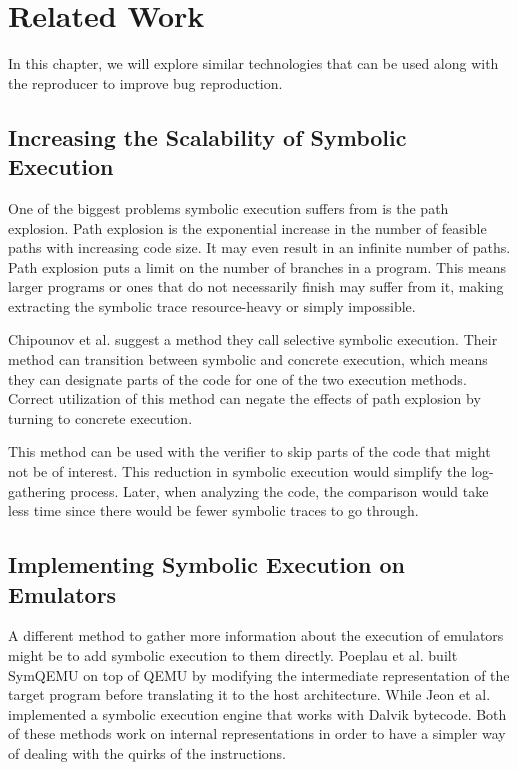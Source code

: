
\chapter{Related Work}\label{chapter:related_work}
In this chapter, we will explore similar technologies that can be used along with the reproducer to improve bug reproduction.

\section{Increasing the Scalability of Symbolic Execution}
One of the biggest problems symbolic execution suffers from is the path explosion.
Path explosion is the exponential increase in the number of feasible paths with increasing code size.
It may even result in an infinite number of paths.
Path explosion puts a limit on the number of branches in a program.
This means larger programs or ones that do not necessarily finish may suffer from it, making extracting the symbolic trace resource-heavy or simply impossible.

Chipounov et al. \cite{chipounov2009selective} suggest a method they call selective symbolic execution.
Their method can transition between symbolic and concrete execution, which means they can designate parts of the code for one of the two execution methods.
Correct utilization of this method can negate the effects of path explosion by turning to concrete execution.

This method can be used with the verifier to skip parts of the code that might not be of interest.
This reduction in symbolic execution would simplify the log-gathering process.
Later, when analyzing the code, the comparison would take less time since there would be fewer symbolic traces to go through.

\section{Implementing Symbolic Execution on Emulators}
A different method to gather more information about the execution of emulators might be to add symbolic execution to them directly.
Poeplau et al. \cite{poeplau2021symqemu} built SymQEMU on top of QEMU by modifying the intermediate representation of the target program before translating it to the host architecture.
While Jeon et al. \cite{jeon2012symdroid} implemented a symbolic execution engine that works with Dalvik bytecode.
Both of these methods work on internal representations in order to have a simpler way of dealing with the quirks of the instructions.

